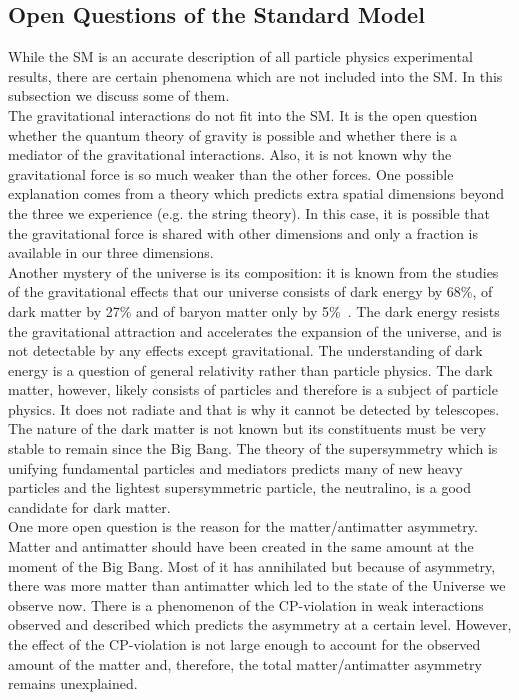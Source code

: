 \subsection{Open Questions of the Standard Model}


While the SM is an accurate description of all particle physics experimental results, there are certain phenomena which are not included into the SM. In this subsection we discuss some of them.\\

The gravitational interactions do not fit into the SM. It is the open question whether the quantum theory of gravity is possible and whether there is a mediator of the gravitational interactions. Also, it is not known why the gravitational force is so much weaker than the other forces. One possible explanation comes from a theory which predicts extra spatial dimensions beyond the three we experience (e.g. the string theory). In this case, it is possible that the gravitational force is shared with other dimensions and only a fraction is available in our three dimensions.\\

Another mystery of the universe is its composition: it is known from the studies of the gravitational effects that our universe consists of dark energy by 68\%, of dark matter by 27\% and of baryon matter only by 5\%~\cite{ref_NASA}. The dark energy resists the gravitational attraction and accelerates the expansion of the universe, and is not detectable by any effects except gravitational. The understanding of dark energy is a question of general relativity rather than particle physics. The dark matter, however, likely consists of particles and therefore is a subject of particle physics. It does not radiate and that is why it cannot be detected by telescopes. The nature of the dark matter is not known but its constituents must be very stable to remain since the Big Bang. The theory of the supersymmetry which is unifying fundamental particles and mediators predicts many of new heavy particles and the lightest supersymmetric particle, the neutralino, is a good candidate for dark matter.\\

One more open question is the reason for the matter/antimatter asymmetry. Matter and antimatter should have been created in the same amount at the moment of the Big Bang. Most of it has annihilated but because of asymmetry, there was more matter than antimatter which led to the state of the Universe we observe now. There is a phenomenon of the CP-violation in weak interactions observed and described which predicts the asymmetry at a certain level. However, the effect of the CP-violation is not large enough to account for the observed amount of the matter and, therefore, the total matter/antimatter asymmetry remains unexplained. \\

